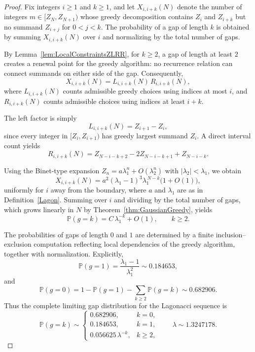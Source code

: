 \documentclass[11pt]{amsart}
\theoremstyle{plain}
\numberwithin{equation}{section} %
\numberwithin{table}{section} %
\numberwithin{figure}{section}
\begin{document}
	\begin{proof}
		Fix integers $i\ge1$ and $k\ge1$, and let $X_{i,i+k}(N)$ denote the number of
		integers $m\in[Z_N,Z_{N+1})$ whose greedy decomposition contains $Z_i$ and
		$Z_{i+k}$ but no summand $Z_{i+j}$ for $0<j<k$.
		The probability of a gap of length $k$ is obtained by summing
		$X_{i,i+k}(N)$ over $i$ and normalizing by the total number of gaps.
		
		By Lemma~\ref{lem:LocalConstraintsZLRR}, for $k\geq 2$, a gap of length at least $2$
		creates a renewal point for the greedy algorithm: no recurrence relation
		can connect summands on either side of the gap. Consequently,
		\[
		X_{i,i+k}(N)=L_{i,i+k}(N)\,R_{i,i+k}(N),
		\]
		where $L_{i,i+k}(N)$ counts admissible greedy choices using indices at most
		$i$, and $R_{i,i+k}(N)$ counts admissible choices using indices at least
		$i+k$.
		
		The left factor is simply
		\[
		L_{i,i+k}(N)=Z_{i+1}-Z_i,
		\]
		since every integer in $[Z_i,Z_{i+1})$ has greedy largest summand $Z_i$.
		A direct interval count yields
		\[
		R_{i,i+k}(N)
		=Z_{N-i-k+2}-2Z_{N-i-k+1}+Z_{N-i-k}.
		\]
		
		Using the Binet-type expansion
		$Z_n=a \lambda_1^n+O(\lambda_2^n)$ with $|\lambda_2|<\lambda_1$, we obtain
		\[
		X_{i,i+k}(N)
		=a^2(\lambda_1-1)^3\lambda_1^{\,N-k}\bigl(1+O(1)\bigr),
		\]
		uniformly for $i$ away from the boundary, where $a$  and $\lambda_1 $ are as in Definition~\ref{Lagon}.
		Summing over $i$ and dividing by the total number of gaps, which grows
		linearly in $N$ by Theorem~\ref{thm:GaussianGreedy}, yields
		\[
		\mathbb{P}(g=k)=C\,\lambda_1^{-k}+O(1),
		\qquad k\ge2.
		\]
		
		The probabilities of gaps of length $0$ and $1$ are determined by a finite
		inclusion--exclusion computation reflecting local dependencies of the greedy
		algorithm, together with normalization. Explicitly,
		\[
		\mathbb{P}(g=1)=\frac{\lambda_1-1}{\lambda_1^2}
		\sim 0.184653,
		\]
		and
		\[
		\mathbb{P}(g=0)
		=1-\mathbb{P}(g=1)-\sum_{k\ge2}\mathbb{P}(g=k)
		\sim  0.682906.
		\]
		Thus the complete limiting gap distribution for the Lagonacci sequence is
		\[
		\mathbb{P}(g=k)\sim 
		\begin{cases}
			0.682906, & k=0,\\
			0.184653, & k=1,\\
			0.056625\,\lambda^{-k}, & k\ge2,
		\end{cases}
		\qquad
		\lambda \sim 1.3247178.
		\]
	\end{proof}
	
\end{document}
